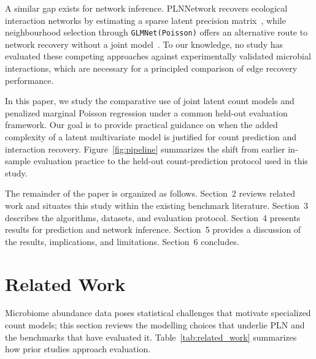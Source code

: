 \documentclass[useAMS,usenatbib,referee]{biom}
\begin{document}
A similar gap exists for network inference.
PLNNetwork recovers ecological interaction networks by estimating a sparse latent precision matrix~\citep{chiquet2019variational}, while neighbourhood selection through \texttt{GLMNet(Poisson)} offers an alternative route to network recovery without a joint model~\citep{Meinshausen2006, Friedman2010}.
To our knowledge, no study has evaluated these competing approaches against experimentally validated microbial interactions, which are necessary for a principled comparison of edge recovery performance.

In this paper, we study the comparative use of joint latent count models and penalized marginal Poisson regression under a common held-out evaluation framework.
Our goal is to provide practical guidance on when the added complexity of a latent multivariate model is justified for count prediction and interaction recovery.
Figure~\ref{fig:pipeline} summarizes the shift from earlier in-sample evaluation practice to the held-out count-prediction protocol used in this study.

The remainder of the paper is organized as follows.
Section~2 reviews related work and situates this study within the existing benchmark literature.
Section~3 describes the algorithms, datasets, and evaluation protocol.
Section~4 presents results for prediction and network inference.
Section~5 provides a discussion of the results, implications, and limitations.
Section~6 concludes.

\section{Related Work}

Microbiome abundance data poses statistical challenges that motivate specialized count models; this section reviews the modelling choices that underlie PLN and the benchmarks that have evaluated it.
Table~\ref{tab:related_work} summarizes how prior studies approach evaluation.
\end{document}
